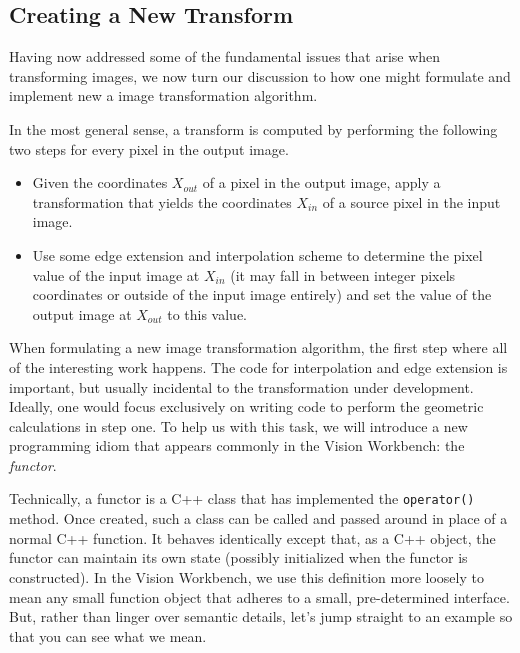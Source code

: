 \subsection{Creating a New Transform}

Having now addressed some of the fundamental issues that arise when
transforming images, we now turn our discussion to how one might
formulate and implement new a image transformation algorithm.

In the most general sense, a transform is computed by performing the
following two steps for every pixel in the output image.

\begin{itemize}
\item Given the coordinates $X_{out}$ of a pixel in the output image,
  apply a transformation that yields the coordinates $X_{in}$ of a
  source pixel in the input image.  
\item Use some edge extension and interpolation scheme to determine
  the pixel value of the input image at $X_{in}$ (it may fall in
  between integer pixels coordinates or outside of the input image
  entirely) and set the value of the output image at $X_{out}$ to this
  value.
\end{itemize} 

When formulating a new image transformation algorithm, the first step
where all of the interesting work happens.  The code for interpolation
and edge extension is important, but usually incidental to the
transformation under development.  Ideally, one would focus
exclusively on writing code to perform the geometric calculations in
step one.  To help us with this task, we will introduce a new
programming idiom that appears commonly in the Vision Workbench: the
{\em functor}.

Technically, a functor is a C++ class that has implemented the
\verb#operator()# method.  Once created, such a class can be called
and passed around in place of a normal C++ function.  It behaves
identically except that, as a C++ object, the functor can maintain its
own state (possibly initialized when the functor is constructed).  In
the Vision Workbench, we use this definition more loosely to mean any
small function object that adheres to a small, pre-determined
interface.  But, rather than linger over semantic details, let's
jump straight to an example so that you can see what we mean.



